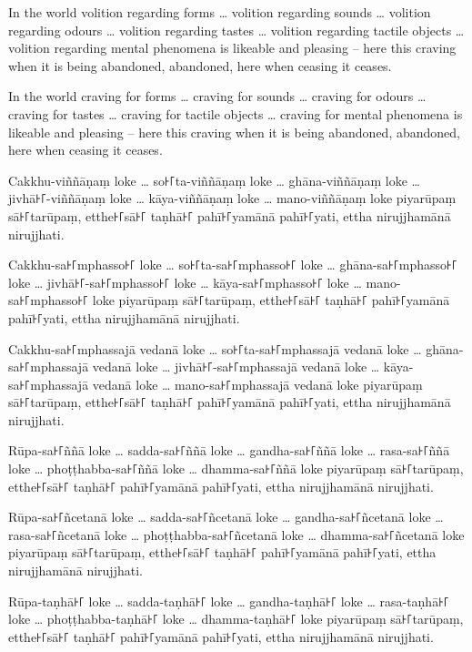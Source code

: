 In the world volition regarding forms \ldots{} volition regarding sounds
\ldots{} volition regarding odours \ldots{} volition regarding tastes \ldots{}
volition regarding tactile objects \ldots{} volition regarding mental phenomena
is likeable and pleasing -- here this craving when it is being abandoned,
abandoned, here when ceasing it ceases.

In the world craving for forms \ldots{} craving for sounds \ldots{} craving for
odours \ldots{} craving for tastes \ldots{} craving for tactile objects \ldots{}
craving for mental phenomena is likeable and pleasing -- here this craving when
it is being abandoned, abandoned, here when ceasing it ceases.

\paliPage

Cakkhu-viññāṇaṃ loke \ldots{} so꜔꜒ta-viññāṇaṃ loke \ldots{} ghāna-viññāṇaṃ loke
\ldots{} jivhā꜔꜒-viññāṇaṃ loke \ldots{} kāya-viññāṇaṃ loke \ldots{} mano-viññāṇaṃ
loke piyarūpaṃ sā꜔꜒tarūpaṃ, etthe꜔꜒sā꜔꜒ taṇhā꜔꜒ pahī꜔꜒yamānā pahī꜔꜒yati, ettha nirujjhamānā
nirujjhati.

Cakkhu-sa꜔꜒mphasso꜔꜒ loke \ldots{} so꜔꜒ta-sa꜔꜒mphasso꜔꜒ loke \ldots{} ghāna-sa꜔꜒mphasso꜔꜒ loke
\ldots{} jivhā꜔꜒-sa꜔꜒mphasso꜔꜒ loke \ldots{} kāya-sa꜔꜒mphasso꜔꜒ loke \ldots{} mano-sa꜔꜒mphasso꜔꜒
loke piyarūpaṃ sā꜔꜒tarūpaṃ, etthe꜔꜒sā꜔꜒ taṇhā꜔꜒ pahī꜔꜒yamānā pahī꜔꜒yati, ettha nirujjhamānā
nirujjhati.

Cakkhu-sa꜔꜒mphassajā vedanā loke \ldots{} so꜔꜒ta-sa꜔꜒mphassajā vedanā loke \ldots{}
ghāna-sa꜔꜒mphassajā vedanā loke \ldots{} jivhā꜔꜒-sa꜔꜒mphassajā vedanā loke \ldots{}
kāya-sa꜔꜒mphassajā vedanā loke \ldots{} mano-sa꜔꜒mphassajā vedanā loke piyarūpaṃ
sā꜔꜒tarūpaṃ, etthe꜔꜒sā꜔꜒ taṇhā꜔꜒ pahī꜔꜒yamānā pahī꜔꜒yati, ettha nirujjhamānā nirujjhati.

Rūpa-sa꜔꜒ññā loke \ldots{} sadda-sa꜔꜒ññā loke \ldots{} gandha-sa꜔꜒ññā loke \ldots{}
rasa-sa꜔꜒ññā loke \ldots{} phoṭṭhabba-sa꜔꜒ññā loke \ldots{} dhamma-sa꜔꜒ññā loke piyarūpaṃ
sā꜔꜒tarūpaṃ, etthe꜔꜒sā꜔꜒ taṇhā꜔꜒ pahī꜔꜒yamānā pahī꜔꜒yati, ettha nirujjhamānā nirujjhati.

Rūpa-sa꜔꜒ñcetanā loke \ldots{} sadda-sa꜔꜒ñcetanā loke \ldots{} gandha-sa꜔꜒ñcetanā loke
\ldots{} rasa-sa꜔꜒ñcetanā loke \ldots{} phoṭṭhabba-sa꜔꜒ñcetanā loke \ldots{}
dhamma-sa꜔꜒ñcetanā loke piyarūpaṃ sā꜔꜒tarūpaṃ, etthe꜔꜒sā꜔꜒ taṇhā꜔꜒ pahī꜔꜒yamānā pahī꜔꜒yati,
ettha nirujjhamānā nirujjhati.

Rūpa-taṇhā꜔꜒ loke \ldots{} sadda-taṇhā꜔꜒ loke \ldots{} gandha-taṇhā꜔꜒ loke \ldots{}
rasa-taṇhā꜔꜒ loke \ldots{} phoṭṭhabba-taṇhā꜔꜒ loke \ldots{} dhamma-taṇhā꜔꜒ loke piyarūpaṃ
sā꜔꜒tarūpaṃ, etthe꜔꜒sā꜔꜒ taṇhā꜔꜒ pahī꜔꜒yamānā pahī꜔꜒yati, ettha nirujjhamānā nirujjhati.

